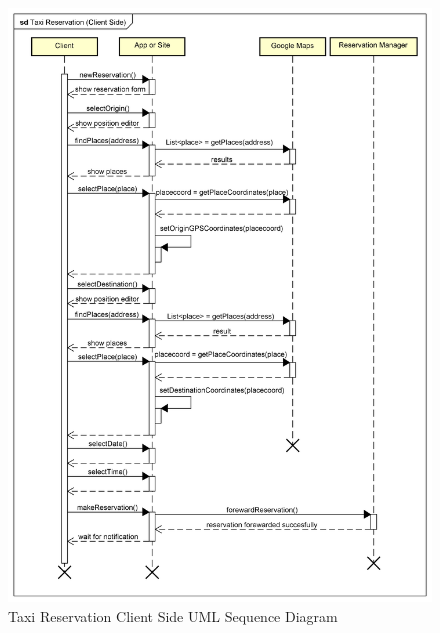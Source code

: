 \documentclass[a4paper]{article}
\begin{document}
\begin{figure}[H]
\includegraphics[width=\sequenceWidth]{Sequence-TaxiReservationClientSide}
\centering
\caption{Taxi Reservation Client Side UML Sequence Diagram}
\label{fig:sequencereservationclientside}
\end{figure}
\end{document}
